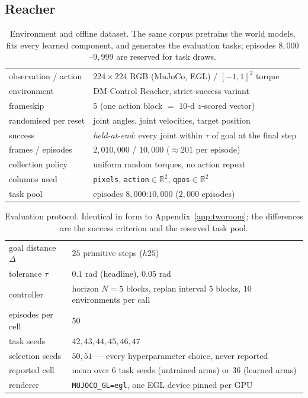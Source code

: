 
\subsection{Reacher}
\label{app:reacher}

\begin{table}[h]
\centering\small
\caption{Environment and offline dataset. The same corpus pretrains the world
models, fits every learned component, and generates the evaluation tasks;
episodes $8{,}000$--$9{,}999$ are reserved for task draws.}
\begin{tabular}{ll}
\toprule
observation / action & $224\times224$ RGB (MuJoCo, EGL) / $[-1,1]^2$ torque \\
environment & DM-Control Reacher, strict-success variant \\
frameskip & $5$ (one action block $=$ $10$-d $z$-scored vector) \\
randomised per reset & joint angles, joint velocities, target position \\
success & \emph{held-at-end}: every joint within $\tau$ of goal at the final step \\
\midrule
frames / episodes & $2{,}010{,}000$ / $10{,}000$ ($\approx\!201$ per episode) \\
collection policy & uniform random torques, no action repeat \\
columns used & \texttt{pixels}, \texttt{action}$\in\mathbb R^2$, \texttt{qpos}$\in\mathbb R^2$ \\
task pool & episodes $8{,}000$:$10{,}000$ ($2{,}000$ episodes) \\
\bottomrule
\end{tabular}
\end{table}

\begin{table}[h]
\centering\small
\caption{Evaluation protocol. Identical in form to
Appendix~\ref{app:tworoom}; the differences are the success criterion and the
reserved task pool.}
\begin{tabular}{ll}
\toprule
goal distance $\Delta$ & $25$ primitive steps ($h25$) \\
tolerance $\tau$ & $0.1$ rad (headline), $0.05$ rad \\
controller & horizon $N{=}5$ blocks, replan interval $5$ blocks, $10$ environments per call \\
episodes per cell & $50$ \\
task seeds & $42,43,44,45,46,47$ \\
selection seeds & $50,51$ --- every hyperparameter choice, never reported \\
reported cell & mean over $6$ task seeds (untrained arms) or $36$ (learned arms) \\
renderer & \texttt{MUJOCO\_GL=egl}, one EGL device pinned per GPU \\
\bottomrule
\end{tabular}
\end{table}

